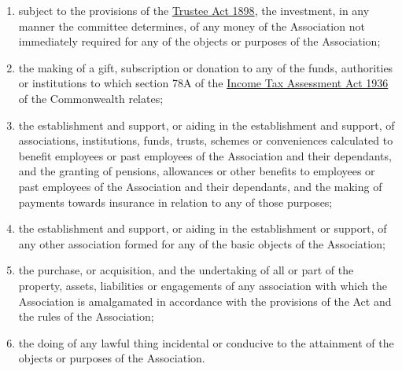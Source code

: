 \begin{enumerate}
	\item subject to the provisions of the \href{https://www.legislation.tas.gov.au/view/html/inforce/2019-05-06/act-1898-034}{Trustee Act 1898}, the investment, in any manner the committee determines, of any money of the Association not immediately required for any of the objects or purposes of the Association;
	\item the making of a gift, subscription or donation to any of the funds, authorities or institutions to which section 78A of the \href{https://www.legislation.gov.au/Series/C1936A00027}{Income Tax Assessment Act 1936} of the Commonwealth relates;
	\item the establishment and support, or aiding in the establishment and support, of associations, institutions, funds, trusts, schemes or conveniences calculated to benefit employees or past employees of the Association and their dependants, and the granting of pensions, allowances or other benefits to employees or past employees of the Association and their dependants, and the making of payments towards insurance in relation to any of those purposes;
	\item the establishment and support, or aiding in the establishment or support, of any other association formed for any of the basic objects of the Association;
	\item the purchase, or acquisition, and the undertaking of all or part of the property, assets, liabilities or engagements of any association with which the Association is amalgamated in accordance with the provisions of the Act and the rules of the Association;
	\item the doing of any lawful thing incidental or conducive to the attainment of the objects or purposes of the Association.
\end{enumerate}